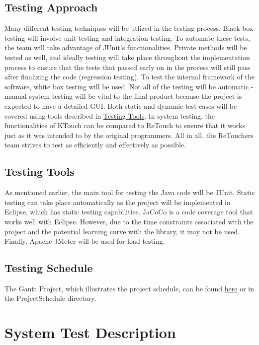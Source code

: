\documentclass[12pt, titlepage]{article}
\begin{document}
\subsection{Testing Approach}

	Many different testing techniques will be utlized in the testing process. Black box testing will involve unit testing and integration testing. To automate these tests, the team will take advantage of JUnit's functionalities. Private methods will be tested as well, and ideally testing will take place throughout the implementation process to ensure that the tests that passed early on in the process will still pass after finalizing the code (regression testing). To test the internal framework of the software, white box testing will be used. Not all of the testing will be automatic - manual system testing will be vital to the final product because the project is expected to have a detailed GUI. Both static and dynamic test cases will be covered using tools described in \hyperref[sec:tt]{Testing Tools}. In system testing, the functionalities of KTouch can be compared to ReTouch to ensure that it works just as it was intended to by the original programmers. All in all, the ReTouchers team strives to test as efficiently and effectively as possible.

\subsection{Testing Tools}
\label{sec:tt}

	As mentioned earlier, the main tool for testing the Java code will be JUnit. Static testing can take place automatically as the project will be implemented in Eclipse, which has static testing capabilities. JaCoCo is a code coverage tool that works well with Eclipse. However, due to the time constraints associated with the project and the potential learning curve with the library, it may not be used. Finally, Apache JMeter will be used for load testing.

\subsection{Testing Schedule}
\label{sec:ts}
		
The Gantt Project, which illustrates the project schedule, can be found \href{run:../../ProjectSchedule/Gantt_Project.gan}{here} or in the ProjectSchedule directory. 

\section{System Test Description}
	
\end{document}

